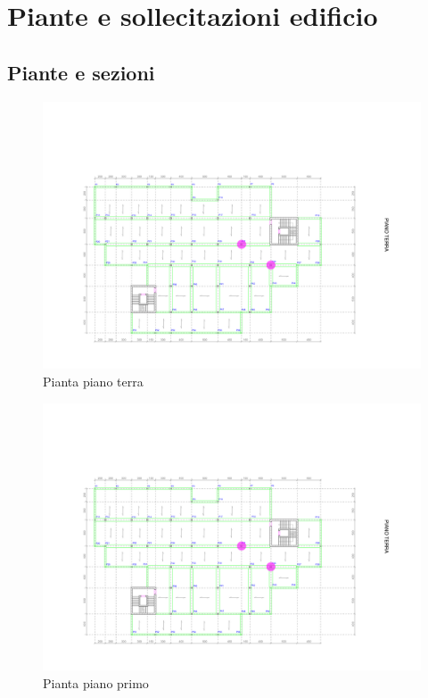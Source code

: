 \chapter{Piante e sollecitazioni edificio}
\section{Piante e sezioni}
\begin{figure}[hp]
    \centering
    \includegraphics[width=\textwidth, page=1]{IMG/PianteEdificio.pdf}
    \caption{Pianta piano terra}
    \label{fig:Pianta_pianoTerra}
\end{figure}
\begin{figure}[hp]
    \centering
    \includegraphics[width=\textwidth, page=2]{IMG/PianteEdificio.pdf}
    \caption{Pianta piano primo}
\end{figure}
